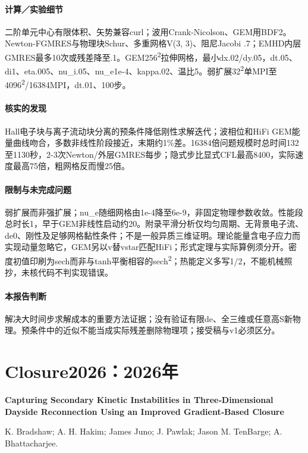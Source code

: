 \paragraph{计算／实验细节}二阶单元中心有限体积、矢势兼容curl；波用Crank-Nicolson、GEM用BDF2。Newton-FGMRES与物理块Schur、多重网格V(3, 3)、阻尼Jacobi .7；EMHD内层GMRES最多10次或残差降至.1。GEM256\textsuperscript{2}拉伸网格，最小dx.02/dy.05，dt.05、di1、eta.005、nu\_i.05、nu\_e1e-4、kappa.02、温比5。弱扩展32\textsuperscript{2}单MPI至4096\textsuperscript{2}/16384MPI，dt.01、100步。

\paragraph{核实的发现}Hall电子块与离子流动块分离的预条件降低刚性求解迭代；波相位和HiFi GEM能量曲线吻合，多数非线性阶段接近，末期约1\%差。16384倍问题规模时总时间132至1130秒，2-3次Newton/外层GMRES每步；隐式步比显式CFL最高8400，实际速度最高75倍，粗网格反而慢25倍。

\paragraph{限制与未完成问题}弱扩展而非强扩展；nu\_e随细网格由1e-4降至6e-9，非固定物理参数收敛。性能段总时长1，早于GEM非线性启动约20。附录平滑分析仅均匀周期、无背景电子流、de0、刚性及足够网格黏性条件；不是一般异质三维证明。理论能量含电子应力而实现动量忽略它，GEM另以v替vstar匹配HiFi；形式定理与实际算例须分开。密度初值印刷为sech而非与tanh平衡相容的sech\textsuperscript{2}；热能定义多写1/2，不能机械照抄，未核代码不判实现错误。

\paragraph{本报告判断}解决大时间步求解成本的重要方法证据；没有验证有限de、全三维或任意高S新物理。预条件中的近似不能当成实际残差删除物理项；接受稿与v1必须区分。

\section{Closure2026：2026年}\label{paper:Closure2026}

\textbf{Capturing Secondary Kinetic Instabilities in Three‐Dimensional Dayside Reconnection Using an Improved Gradient‐Based Closure}\citep{Closure2026}\

K. Bradshaw;  A. H. Hakim;  James Juno;  J. Pawlak;  Jason M. TenBarge;  A. Bhattacharjee.

